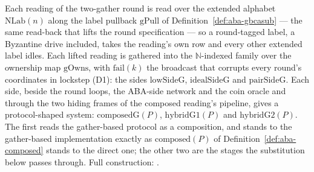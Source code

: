 \begin{definition}
  \label{def:aba-gather-side}
  \leanok
  Each reading of the two-gather round is read over the extended alphabet $\mathrm{NLab}(n)$ along the label pullback $\mathrm{gPull}$ of Definition~\ref{def:aba-gbcasub} --- the same read-back that lifts the round specification --- so a round-tagged label, a Byzantine drive included, takes the reading's own row and every other extended label idles.
  Each lifted reading is gathered into the $\mathbb{N}$-indexed family over the ownership map $\mathrm{gOwns}$, with $\mathrm{fail}(k)$ the broadcast that corrupts every round's coordinates in lockstep (D1): the sides $\mathrm{lowSideG}$, $\mathrm{idealSideG}$ and $\mathrm{pairSideG}$.
  Each side, beside the round loops, the ABA-side network and the coin oracle and through the two hiding frames of the composed reading's pipeline, gives a protocol-shaped system: $\mathrm{composedG}(P)$, $\mathrm{hybridG1}(P)$ and $\mathrm{hybridG2}(P)$.
  The first reads the gather-based protocol as a composition, and stands to the gather-based implementation exactly as $\mathrm{composed}(P)$ of Definition~\ref{def:aba-composed} stands to the direct one; the other two are the stages the substitution below passes through.
  Full construction: .
\end{definition}

